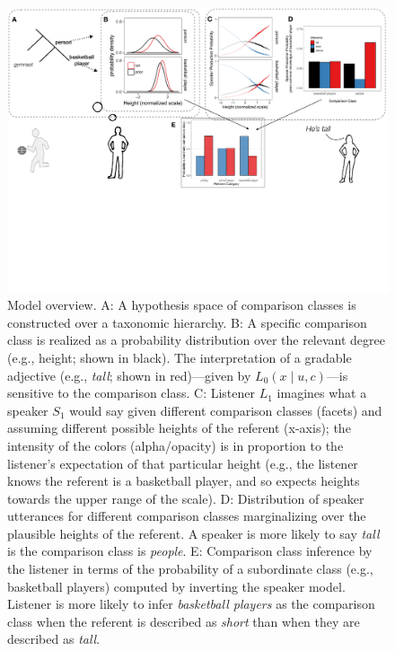 \documentclass[doc]{apa6}
\begin{document}
\begin{figure}
\centering
\includegraphics[width=\textwidth]{figs/model_cartoon.pdf}
\caption{\small \label{fig:modelCartoon}Model overview. A: A hypothesis space of comparison classes is constructed over a taxonomic hierarchy. B: A specific comparison class is realized as a probability distribution over the relevant degree (e.g., height; shown in black). The interpretation of a gradable adjective (e.g., \emph{tall}; shown in red)---given by $L_{0}(x \mid u, c)$---is sensitive to the comparison class. C: Listener $L_1$ imagines what a speaker $S_1$ would say given different comparison classes (facets) and assuming different possible heights of the referent (x-axis); the intensity of the colors (alpha/opacity) is in proportion to the listener's expectation of that particular height (e.g., the listener knows the referent is a basketball player, and so expects heights towards the upper range of the scale). D: Distribution of speaker utterances for different comparison classes marginalizing over the plausible heights of the referent. A speaker is more likely to say \emph{tall} is the comparison class is \emph{people}. E: Comparison class inference by the listener in terms of the probability of a subordinate class (e.g., basketball players) computed by inverting the speaker model. Listener is more likely to infer \emph{basketball players} as the comparison class when the referent is described as \emph{short} than when they are described as \emph{tall}.
}
\end{figure}
\end{document}
